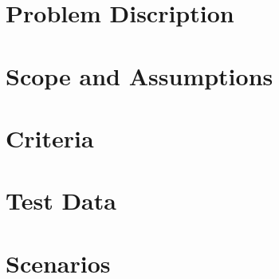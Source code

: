 \documentclass[a4paper,12pt]{article}
\begin{document}
  \section{Problem Discription}


  \section{Scope and Assumptions}
  \section{Criteria}
  \section{Test Data}

  \section{Scenarios}
\end{document}
